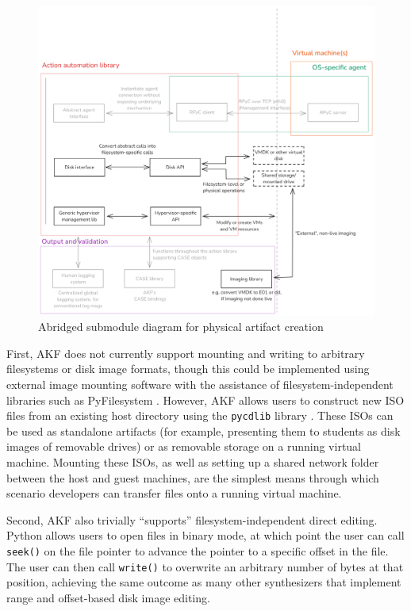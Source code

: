 \documentclass[letterpaper,12pt]{report}
\newcommand{\passthrough}[1]{#1}
\begin{document}
\begin{figure}[htbp]
\centering
\includegraphics[width=1\linewidth]{action-physical.png}
\caption{Abridged submodule diagram for physical artifact
creation}\label{fig:action-physical}
\end{figure}

First, AKF does not currently support mounting and writing to arbitrary
filesystems or disk image formats, though this could be implemented
using external image mounting software with the assistance of
filesystem-independent libraries such as PyFilesystem
\cite{PyFilesystemPyfilesystem22025}. However, AKF allows users to
construct new ISO files from an existing host directory using the
\passthrough{\lstinline!pycdlib!} library
\cite{lalancetteClalancettePycdlib2025}. These ISOs can be used as
standalone artifacts (for example, presenting them to students as disk
images of removable drives) or as removable storage on a running virtual
machine. Mounting these ISOs, as well as setting up a shared network
folder between the host and guest machines, are the simplest means
through which scenario developers can transfer files onto a running
virtual machine.

Second, AKF also trivially ``supports'' filesystem-independent direct
editing. Python allows users to open files in binary mode, at which
point the user can call \passthrough{\lstinline!seek()!} on the file
pointer to advance the pointer to a specific offset in the file. The
user can then call \passthrough{\lstinline!write()!} to overwrite an
arbitrary number of bytes at that position, achieving the same outcome
as many other synthesizers that implement range and offset-based disk
image editing.
\end{document}

